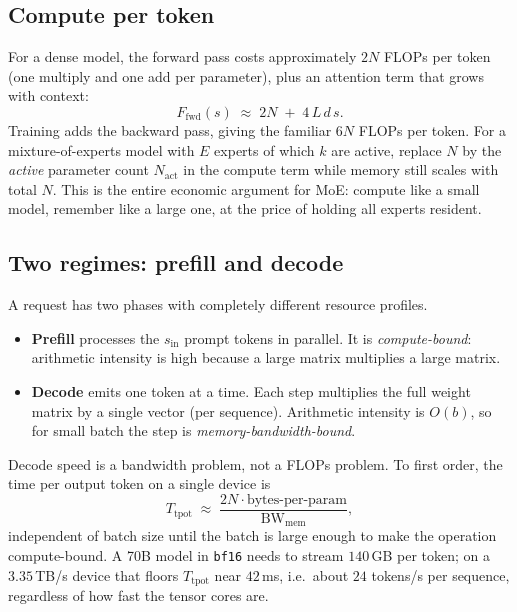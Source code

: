 \documentclass[11pt,twoside,openright]{book}
\theoremstyle{definition}
\theoremstyle{plain}
\theoremstyle{remark}
\newcommand{\code}[1]{\texttt{\small #1}}
\newcommand{\term}[1]{\textbf{#1}}
\newcommand{\tpot}{\ensuremath{T_{\mathrm{tpot}}}}
\begin{document}
\subsection{Compute per token}

For a dense model, the forward pass costs approximately $2N$ FLOPs per token
(one multiply and one add per parameter), plus an attention term that grows with
context:
\begin{equation}
  F_{\text{fwd}}(s) \;\approx\; 2N \;+\; 4\,L\,d\,s .
\label{eq:flops}
\end{equation}
Training adds the backward pass, giving the familiar $6N$ FLOPs per token.
For a mixture-of-experts model with $E$ experts of which $k$ are active, replace
$N$ by the \emph{active} parameter count $N_{\text{act}}$ in the compute term
while memory still scales with total $N$. This is the entire economic argument
for MoE: compute like a small model, remember like a large one, at the price of
holding all experts resident.

\subsection{Two regimes: prefill and decode}

A request has two phases with completely different resource profiles.

\begin{itemize}[leftmargin=1.4em]
  \item \term{Prefill} processes the $s_{\text{in}}$ prompt tokens in parallel.
        It is \emph{compute-bound}: arithmetic intensity is high because a large
        matrix multiplies a large matrix.
  \item \term{Decode} emits one token at a time. Each step multiplies the full
        weight matrix by a single vector (per sequence). Arithmetic intensity is
        $O(b)$, so for small batch the step is \emph{memory-bandwidth-bound}.
\end{itemize}

\begin{keyidea}
Decode speed is a bandwidth problem, not a FLOPs problem. To first order, the
time per output token on a single device is
\[
  \tpot \;\approx\; \frac{2N \cdot \text{bytes-per-param}}{\text{BW}_{\text{mem}}},
\]
independent of batch size until the batch is large enough to make the operation
compute-bound. A 70B model in \code{bf16} needs to stream $140$\,GB per token;
on a $3.35$\,TB/s device that floors $\tpot$ near $42$\,ms, i.e.\ about
$24$ tokens/s per sequence, regardless of how fast the tensor cores are.
\end{keyidea}
\end{document}

